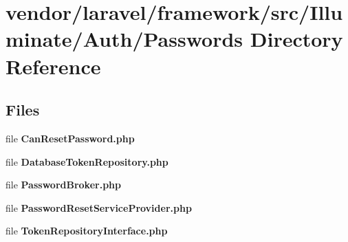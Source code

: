 \section{vendor/laravel/framework/src/\+Illuminate/\+Auth/\+Passwords Directory Reference}
\label{dir_da758934a1c1aff22d10c235066884b7}
\subsection*{Files}
\begin{DoxyCompactItemize}
\item 
file {\bf Can\+Reset\+Password.\+php}
\item 
file {\bf Database\+Token\+Repository.\+php}
\item 
file {\bf Password\+Broker.\+php}
\item 
file {\bf Password\+Reset\+Service\+Provider.\+php}
\item 
file {\bf Token\+Repository\+Interface.\+php}
\end{DoxyCompactItemize}

